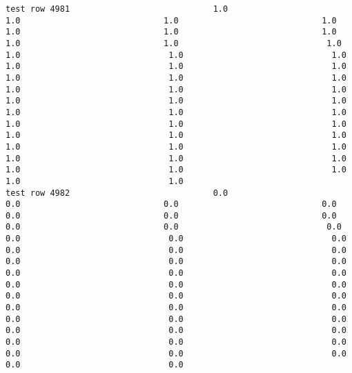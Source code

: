 \documentclass[11pt]{article}
\begin{document}
\begin{verbatim}
test row 4981                             1.0                             1.0                             1.0                             1.0                             1.0                             1.0                             1.0                             1.0                             1.0                              1.0                              1.0                              1.0                              1.0                              1.0                              1.0                              1.0                              1.0                              1.0                              1.0                              1.0                              1.0                              1.0                              1.0                              1.0                              1.0                              1.0                              1.0                              1.0                              1.0                              1.0                              1.0                              1.0                              1.0                              1.0                              1.0                              1.0                              1.0                              1.0                              1.0                              1.0                              1.0                              1.0                              1.0                              1.0                              1.0
test row 4982                             0.0                             0.0                             0.0                             0.0                             0.0                             0.0                             0.0                             0.0                             0.0                              0.0                              0.0                              0.0                              0.0                              0.0                              0.0                              0.0                              0.0                              0.0                              0.0                              0.0                              0.0                              0.0                              0.0                              0.0                              0.0                              0.0                              0.0                              0.0                              0.0                              0.0                              0.0                              0.0                              0.0                              0.0                              0.0                              0.0                              0.0                              0.0                              0.0                              0.0                              0.0                              0.0                              0.0                              0.0                              0.0

\end{verbatim}
\end{document}

